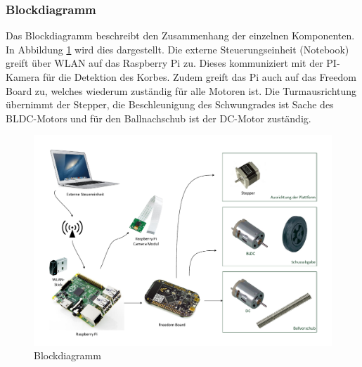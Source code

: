 \subsubsection{Blockdiagramm}
Das Blockdiagramm beschreibt den Zusammenhang der einzelnen Komponenten. In Abbildung \ref{fig:blockdiagramm} wird dies dargestellt. Die externe Steuerungseinheit (Notebook) greift über WLAN auf das Raspberry Pi zu. Dieses kommuniziert mit der PI-Kamera für die Detektion des Korbes. Zudem greift das Pi auch auf das Freedom Board zu, welches wiederum zuständig für alle Motoren ist. Die Turmausrichtung übernimmt der Stepper, die Beschleunigung des Schwungrades ist Sache des BLDC-Motors und für den Ballnachschub ist der DC-Motor zuständig.

\begin{figure}[h!]
\centering
\includegraphics[width=0.9\linewidth]{../../fig/blockdiagramm}
\caption{Blockdiagramm}
\label{fig:blockdiagramm}
\end{figure}
